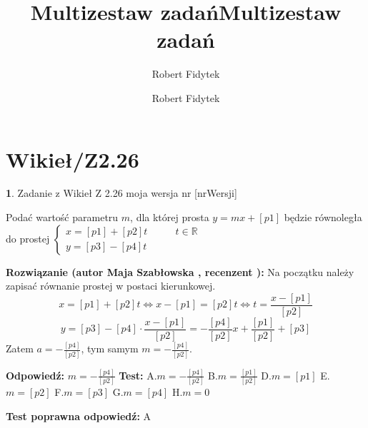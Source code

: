 \documentclass[12pt, a4paper]{article}
\title{Multizestaw zadań}
\author{Robert Fidytek}
\date{}\documentclass[12pt, a4paper]{article}
\title{Multizestaw zadań}
\author{Robert Fidytek}
\date{}
\theoremstyle{definition} %
\newtheorem{zad}{}
\theoremstyle{definition} %
\newtheorem{zad}{}
\newcommand{\kategoria}[1]{\section{#1}} %
\newcommand{\zadStart}[1]{\begin{zad}#1\newline} %
\newcommand{\zadStop}{\end{zad}}   %
\newcommand{\rozwStart}[2]{\noindent \textbf{Rozwiązanie (autor #1 , recenzent #2): }\newline} %
\newcommand{\rozwStop}{\newline}                                            %
\newcommand{\odpStart}{\noindent \textbf{Odpowiedź:}\newline}    %
\newcommand{\odpStop}{\newline}                                             %
\newcommand{\testStart}{\noindent \textbf{Test:}\newline} %
\newcommand{\testStop}{\newline} %
\newcommand{\kluczStart}{\noindent \textbf{Test poprawna odpowiedź:}\newline} %
\newcommand{\kluczStop}{\newline} %
\begin{document}
\maketitle


\kategoria{Wikieł/Z2.26}
\zadStart{Zadanie z Wikieł Z 2.26 moja wersja nr [nrWersji]}

Podać wartość parametru $m$, dla której prosta $y=mx+[p1]$ będzie równoległa do prostej $\left\{ \begin{array}{ll}
x=[p1]+[p2]t & \quad \quad t\in\mathbb{R}\\
y=[p3]-[p4]t
\end{array} \right.$

\zadStop

\rozwStart{Maja Szabłowska}{}
Na początku należy zapisać równanie prostej w postaci kierunkowej.
$$x=[p1]+[p2]t \iff x-[p1]=[p2]t \iff t=\frac{x-[p1]}{[p2]}$$
$$y=[p3]-[p4]\cdot\frac{x-[p1]}{[p2]}=-\frac{[p4]}{[p2]}x+\frac{[p1]}{[p2]}+[p3]$$
Zatem $a=-\frac{[p4]}{[p2]}$, tym samym $m=-\frac{[p4]}{[p2]}.$


\rozwStop


\odpStart
$m=-\frac{[p4]}{[p2]}$
\odpStop
\testStart
A.$m=-\frac{[p4]}{[p2]}$
B.$m=\frac{[p1]}{[p2]}$
D.$m=[p1]$
E.$m=[p2]$
F.$m=[p3]$
G.$m=[p4]$
H.$m=0$

\testStop
\kluczStart
A
\kluczStop
\end{document}
